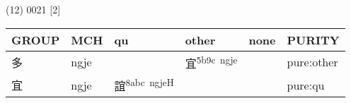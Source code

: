 \documentclass[14pt,a4paper]{scrartcl}
\begin{document}
(12) 0021 {[}2{]}

\begin{longtable}[c]{@{}llllll@{}}
\toprule
\begin{minipage}[b]{0.14\columnwidth}\raggedright\strut
GROUP
\strut\end{minipage} &
\begin{minipage}[b]{0.14\columnwidth}\raggedright\strut
MCH
\strut\end{minipage} &
\begin{minipage}[b]{0.14\columnwidth}\raggedright\strut
qu
\strut\end{minipage} &
\begin{minipage}[b]{0.14\columnwidth}\raggedright\strut
other
\strut\end{minipage} &
\begin{minipage}[b]{0.14\columnwidth}\raggedright\strut
none
\strut\end{minipage} &
\begin{minipage}[b]{0.14\columnwidth}\raggedright\strut
PURITY
\strut\end{minipage}\tabularnewline
\midrule
\endhead
\begin{minipage}[t]{0.14\columnwidth}\raggedright\strut
多
\strut\end{minipage} &
\begin{minipage}[t]{0.14\columnwidth}\raggedright\strut
ngje
\strut\end{minipage} &
\begin{minipage}[t]{0.14\columnwidth}\raggedright\strut
\strut\end{minipage} &
\begin{minipage}[t]{0.14\columnwidth}\raggedright\strut
宜\textsuperscript{5b9c~ngje}
\strut\end{minipage} &
\begin{minipage}[t]{0.14\columnwidth}\raggedright\strut
\strut\end{minipage} &
\begin{minipage}[t]{0.14\columnwidth}\raggedright\strut
pure:other
\strut\end{minipage}\tabularnewline
\begin{minipage}[t]{0.14\columnwidth}\raggedright\strut
宜
\strut\end{minipage} &
\begin{minipage}[t]{0.14\columnwidth}\raggedright\strut
ngje
\strut\end{minipage} &
\begin{minipage}[t]{0.14\columnwidth}\raggedright\strut
誼\textsuperscript{8abc~ngjeH}
\strut\end{minipage} &
\begin{minipage}[t]{0.14\columnwidth}\raggedright\strut
\strut\end{minipage} &
\begin{minipage}[t]{0.14\columnwidth}\raggedright\strut
\strut\end{minipage} &
\begin{minipage}[t]{0.14\columnwidth}\raggedright\strut
pure:qu
\strut\end{minipage}\tabularnewline
\bottomrule
\end{longtable}
\end{document}
